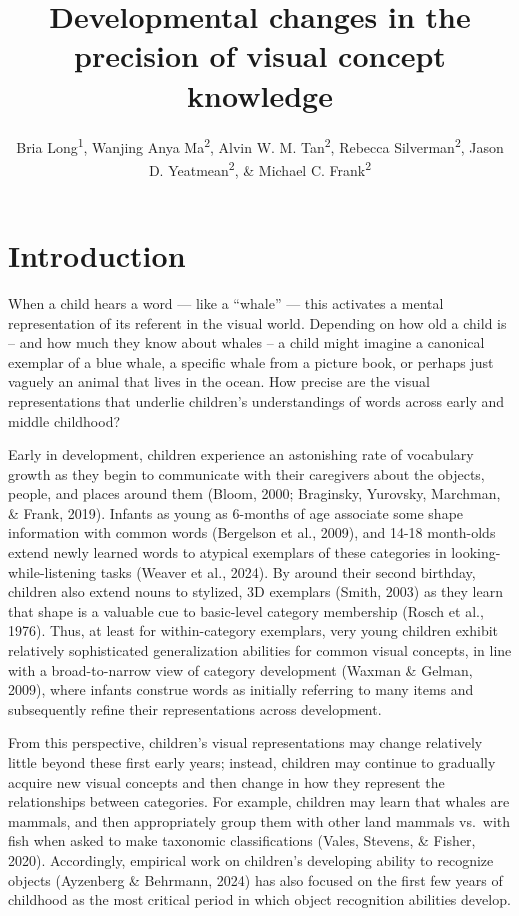 \documentclass[
  man,floatsintext]{apa6}
\title{Developmental changes in the precision of visual concept knowledge}
\author{Bria Long\textsuperscript{1}, Wanjing Anya Ma\textsuperscript{2}, Alvin W. M. Tan\textsuperscript{2}, Rebecca Silverman\textsuperscript{2}, Jason D. Yeatmean\textsuperscript{2}, \& Michael C. Frank\textsuperscript{2}}
\date{}
\affiliation{\vspace{0.5cm}\textsuperscript{1} University of California San Diego\\\textsuperscript{2} Stanford University}
\begin{document}
\maketitle

\section{Introduction}\label{introduction}

When a child hears a word --- like a ``whale'' --- this activates a mental representation of its referent in the visual world. Depending on how old a child is -- and how much they know about whales -- a child might imagine a canonical exemplar of a blue whale, a specific whale from a picture book, or perhaps just vaguely an animal that lives in the ocean. How precise are the visual representations that underlie children's understandings of words across early and middle childhood?

Early in development, children experience an astonishing rate of vocabulary growth as they begin to communicate with their caregivers about the objects, people, and places around them (Bloom, 2000; Braginsky, Yurovsky, Marchman, \& Frank, 2019). Infants as young as 6-months of age associate some shape information with common words (Bergelson et al., 2009), and 14-18 month-olds extend newly learned words to atypical exemplars of these categories in looking-while-listening tasks (Weaver et al., 2024). By around their second birthday, children also extend nouns to stylized, 3D exemplars (Smith, 2003) as they learn that shape is a valuable cue to basic-level category membership (Rosch et al., 1976). Thus, at least for within-category exemplars, very young children exhibit relatively sophisticated generalization abilities for common visual concepts, in line with a broad-to-narrow view of category development (Waxman \& Gelman, 2009), where infants construe words as initially referring to many items and subsequently refine their representations across development.

From this perspective, children's visual representations may change relatively little beyond these first early years; instead, children may continue to gradually acquire new visual concepts and then change in how they represent the relationships between categories. For example, children may learn that whales are mammals, and then appropriately group them with other land mammals vs.~with fish when asked to make taxonomic classifications (Vales, Stevens, \& Fisher, 2020). Accordingly, empirical work on children's developing ability to recognize objects (Ayzenberg \& Behrmann, 2024) has also focused on the first few years of childhood as the most critical period in which object recognition abilities develop.
\end{document}
